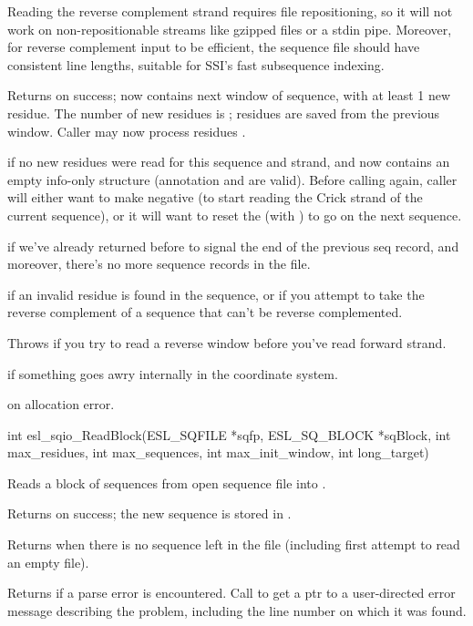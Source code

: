 \begin{sreapi}
Reading the reverse complement strand requires file
repositioning, so it will not work on non-repositionable
streams like gzipped files or a stdin pipe. Moreover,
for reverse complement input to be efficient, the
sequence file should have consistent line lengths, 
suitable for SSI's fast subsequence indexing.

Returns  on success;  now contains next window of
sequence, with at least 1 new residue. The number
of new residues is ;  residues are 
saved from the previous window. Caller may now
process residues .

 if no new residues were read for this sequence
and strand, and  now contains an empty info-only
structure (annotation and  are valid). Before calling
 again, caller will either want
to make  negative (to start reading the Crick strand
of the current sequence), or it will want to reset the
 (with ) to go on the next sequence.

 if we've already returned  before to
signal the end of the previous seq record, and moreover,
there's no more sequence records in the file.

 if an invalid residue is found in the
sequence, or if you attempt to take the reverse
complement of a sequence that can't be reverse
complemented.

Throws  if you try to read a reverse window before
you've read forward strand.

 if something goes awry internally in the
coordinate system.

 on allocation error.


\hypertarget{func:esl_sqio_ReadBlock()}
{\item[int esl\_sqio\_ReadBlock(ESL\_SQFILE *sqfp, ESL\_SQ\_BLOCK *sqBlock, int max\_residues, int max\_sequences, int max\_init\_window, int long\_target)]}

Reads a block of sequences from open sequence file  into 
.

Returns  on success; the new sequence is stored in .

Returns  when there is no sequence left in the
file (including first attempt to read an empty file).

Returns  if a parse error is encountered.
Call  to get a ptr to a
user-directed error message describing the problem,
including the line number on which it was found.


\end{sreapi}
